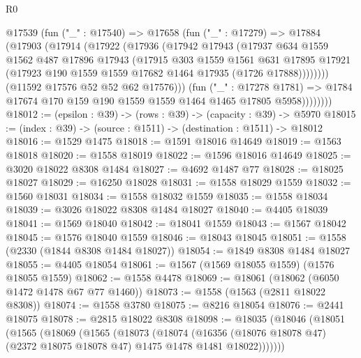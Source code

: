 \begin{lexlean}{R0}
\begin{coremodule}
              @17539
                (fun ("_" : @17540) =>
                @17658
                  (fun ("_" : @17279) =>
                  @17884
                    (@17903
                      (@17914
                        (@17922
                          (@17936
                            (@17942
                              @17943
                              (@17937
                                @634
                                @1559
                                @1562
                                @487
                                @17896
                                @17943
                                (@17915
                                  @303
                                  @1559
                                  @1561
                                  @631
                                  @17895
                                  @17921
                                  (@17923 @190 @1559 @1559 @17682 @1464 @17935 (@1726 @17888))))))))
                      (@11592 @17576 @52 @52 @62 @17576)))
                  (fun ("_" : @17278 @1781) =>
                  @1784 @17674 @170 @159 @190 @1559 @1559 @1464 @1465 @17805 @5958))))))))
@18012 := (epsilon : @39) -> (rows : @39) -> (capacity : @39) -> @5970
@18015 := (index : @39) -> (source : @1511) -> (destination : @1511) -> @18012
@18016 := @1529 @1475
@18018 := @1591 @18016 @14649
@18019 := @1563 @18018
@18020 := @1558 @18019
@18022 := @1596 @18016 @14649
@18025 := @3020 @18022 @8308 @1484
@18027 := @4692 @1487 @77
@18028 := @18025 @18027
@18029 := @16250 @18028
@18031 := @1558 @18029 @1559
@18032 := @1560 @18031
@18034 := @1558 @18032 @1559
@18035 := @1558 @18034
@18039 := @3026 @18022 @8308 @1484 @18027
@18040 := @4405 @18039
@18041 := @1569 @18040
@18042 := @18041 @1559
@18043 := @1567 @18042
@18045 := @1576 @18040 @1559
@18046 := @18043 @18045
@18051 := @1558 (@2330 (@1844 @8308 @1484 @18027))
@18054 := @1849 @8308 @1484 @18027
@18055 := @4405 @18054
@18061 := @1567 (@1569 @18055 @1559) (@1576 @18055 @1559)
@18062 := @1558 @4478
@18069 := @18061 (@18062 (@6050 @1472 @1478 @67 @77 @1460))
@18073 := @1558 (@1563 (@2811 @18022 @8308))
@18074 := @1558 @3780
@18075 := @8216 @18054
@18076 := @2441 @18075
@18078 := @2815 @18022 @8308
@18098 := @18035
    (@18046
      (@18051
        (@1565
          (@18069
            (@1565
              (@18073
                (@18074
                  (@16356
                    (@18076 @18078 @47)
                    (@2372 @18075 @18078 @47)
                    @1475
                    @1478
                    @1481
                    @18022)))))))

\end{coremodule}
\end{lexlean}
